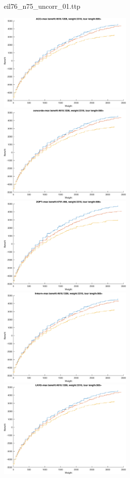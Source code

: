 \documentclass{article}
\begin{document}
\newpage
eil76\_n75\_uncorr\_01.ttp

\noindent
\includegraphics[width=0.5\textwidth]{eil76figs/eil76_n75_uncorr_01.ttp.aco.txt.atsf.eps}
\includegraphics[width=0.5\textwidth]{eil76figs/eil76_n75_uncorr_01.ttp.con.txt.atsf.eps}
\includegraphics[width=0.5\textwidth]{eil76figs/eil76_n75_uncorr_01.ttp.inv.txt.atsf.eps}
\includegraphics[width=0.5\textwidth]{eil76figs/eil76_n75_uncorr_01.ttp.lkh.txt.atsf.eps}
\includegraphics[width=0.5\textwidth]{eil76figs/eil76_n75_uncorr_01.ttp.lkh2.txt.atsf.eps}
\end{document}
